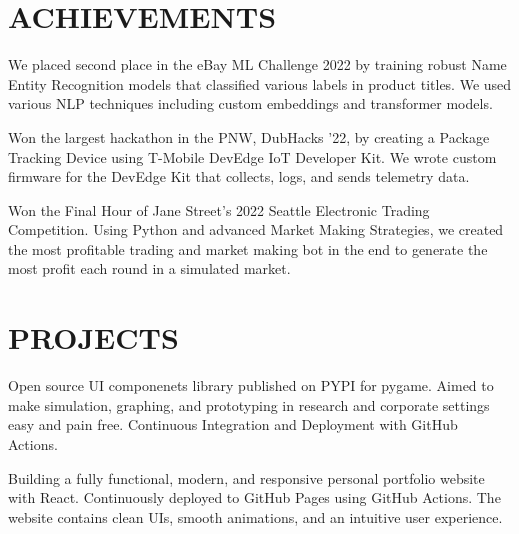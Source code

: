 \documentclass[]{main}
\begin{document}
\begin{minipage}[t]{0.66\textwidth}

\section{ACHIEVEMENTS}

We placed second place in the eBay ML Challenge 2022 by training robust Name Entity Recognition models that classified various labels in product titles. We used various NLP techniques including custom embeddings and transformer models.
\sectionsep

Won the largest hackathon in the PNW, DubHacks '22, by creating a Package Tracking Device using T-Mobile DevEdge IoT Developer Kit. We wrote custom firmware for the DevEdge Kit that collects, logs, and sends telemetry data.
\sectionsep

Won the Final Hour of Jane Street's 2022 Seattle Electronic Trading Competition. Using Python and advanced Market Making Strategies, we created the most profitable trading and market making bot in the end to generate the most profit each round in a simulated market.
\sectionsep



\section{PROJECTS}
Open source UI componenets library published on PYPI for pygame. Aimed to make simulation, graphing, and prototyping in research and corporate settings easy and pain free. Continuous Integration and Deployment with GitHub Actions. 
\sectionsep

Building a fully functional, modern, and responsive personal portfolio website with React. Continuously deployed to GitHub Pages using GitHub Actions. The website contains clean UIs, smooth animations, and an intuitive user experience.

\sectionsep

\end{minipage} 
\end{document}
